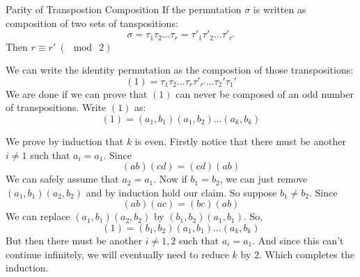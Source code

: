 \theo{}
{Parity of Transpostion Composition}{
    If the permutation $\sigma$ is written as composition of two sets of
    tanspositions:
    \[\sigma = \tau_1\tau_2\dots \tau_r = \tau'_1\tau'_2\dots \tau'_{r'}\] 
    Then $r \equiv r'\ (\mod\ 2)$
}

\begin{prooof}
    We can write the identity permutation as the compostion of those
    transpositions:
    \[\left(1\right)= \tau_1\tau_2\dots \tau_r\tau'_{r'}\dots \tau_2'\tau_1'\] 
    We are done if we can prove that $(1)$ can never be composed of an odd
    number of transpositions. Write $(1)$ as:
    \[\left(1\right)  = \left(a_1, b_1\right) \left(a_1, b_2\right) \dots
    \left(a_k, b_k\right)\] 

    We prove by induction that $k$ is even. Firstly notice that there must be
    another $i\ne 1$ such that $a_i = a_1$. Since 
    \[\left(ab\right) \left(cd\right) = \left(cd\right) \left(ab\right)\] 
    We can safely assume that $a_2=a_1$. Now if $b_1=b_2$, we can just remove
    $(a_1, b_1)(a_2, b_2)$ and by induction hold our claim. So suppose $b_1\ne
    b_2$. Since 
    \[\left(ab\right) \left(ac\right) = \left(bc\right) \left(ab\right)\]
    We can replace $\left(a_1, b_1\right) (a_2, b_2)$ by $\left(b_1,
    b_2\right) \left(a_1, b_1\right)$. So,
    \[\left(1\right)=\left(b_1, b_2\right)\left(a_1, b_1\right)\dots
    \left(a_k, b_k\right)\]
    But then there must be another $i\ne 1, 2$ such that $a_i = a_1$. And
    since this can't continue infinitely, we will eventually need to reduce
    $k$ by $2$. Which completes the induction.
\end{prooof}



